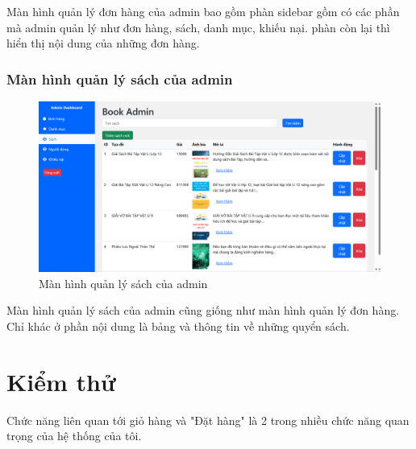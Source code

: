 \documentclass[../DoAn.tex]{subfiles}
\begin{document}
Màn hình quản lý đơn hàng của admin bao gồm phàn sidebar gồm có các phần mà admin quản lý như đơn hàng, sách, danh mục, khiếu nại. phàn còn lại thì hiển thị nội dung của những đơn hàng.

\subsubsection{Màn hình quản lý sách của admin}
\begin{figure}[H]
    \centering
    \includegraphics[width=1\linewidth]{Hinhve/book admin.png}
    \caption{Màn hình quản lý sách của admin}
    \label{fig:visual book admin}
\end{figure}

Màn hình quản lý sách của admin cũng giống như màn hình quản lý đơn hàng. Chỉ khác ở phần nội dung là bảng và thông tin về những quyển sách.
\section{Kiểm thử}

Chức năng liên quan tới giỏ hàng và "Đặt hàng" là 2 trong nhiều chức năng quan trọng của hệ thống của tôi.
\end{document}
